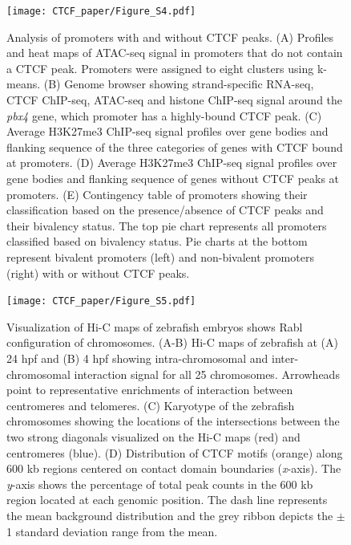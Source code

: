 		\begin{figure}[h!]
			\centering
			\texttt{[image: CTCF\_paper/Figure\_S4.pdf]}
  			\caption[eight]{Analysis of promoters with and without CTCF peaks.
(A) Profiles and heat maps of ATAC-seq signal in promoters that do not contain a CTCF peak. Promoters were assigned to eight clusters using k-means.
(B) Genome browser showing strand-specific RNA-seq, CTCF ChIP-seq, ATAC-seq and histone ChIP-seq signal around the \textit{pbx4} gene, which promoter has a highly-bound CTCF peak.
(C) Average H3K27me3 ChIP-seq signal profiles over gene bodies and flanking sequence of the three categories of genes with CTCF bound at promoters.
(D) Average H3K27me3 ChIP-seq signal profiles over gene bodies and flanking sequence of genes without CTCF peaks at promoters.
(E) Contingency table of promoters showing their classification based on the presence/absence of CTCF peaks and their bivalency status. The top pie chart represents all promoters classified based on bivalency status. Pie charts at the bottom represent bivalent promoters (left) and non-bivalent promoters (right) with or without CTCF peaks.}
			\label{eight}
		\end{figure}

		\newpage

		\begin{figure}[h!]
			\centering
			\texttt{[image: CTCF\_paper/Figure\_S5.pdf]}
  			\caption[nine]{Visualization of Hi-C maps of zebrafish embryos shows Rabl configuration of chromosomes.
(A-B) Hi-C maps of zebrafish at (A) 24 hpf and (B) 4 hpf showing intra-chromosomal and inter-chromosomal interaction signal for all 25 chromosomes. Arrowheads point to representative enrichments of interaction between centromeres and telomeres.
(C) Karyotype of the zebrafish chromosomes showing the locations of the intersections between the two strong diagonals visualized on the Hi-C maps (red) and centromeres (blue).
(D) Distribution of CTCF motifs (orange) along 600 kb regions centered on contact domain boundaries (\textit{x}-axis). The \textit{y}-axis shows the percentage of total peak counts in the 600 kb region located at each genomic position. The dash line represents the mean background distribution and the grey ribbon depicts the $\pm$ 1 standard deviation range from the mean.}
			\label{nine}
		\end{figure}

		\newpage

		

		

		


